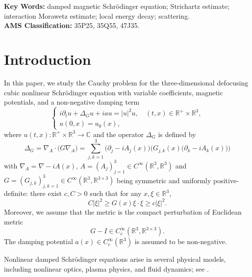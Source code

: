 \documentclass[10pt%
]{amsart}
\numberwithin{equation}{section}
\newcommand{\pa}{\partial}
\newcommand{\R}{\mathbb{R}}
\newcommand{\C}{\mathbb{C}}
\theoremstyle{definition}
\begin{document}
	
	
	\maketitle
	
	\begin{center}
		\begin{minipage}{100mm}
			{ \small {{\bf Key Words:}  damped magnetic  Schr\"odinger equation; Strichartz estimate;  interaction Morawetz estimate; local energy decay; scattering.}
				{}
			}\\
			{ \small {\bf AMS Classification:}
				{35P25,  35Q55, 47J35.}
			}
		\end{minipage}
	\end{center}
	
	
	\section{Introduction}
	
	\noindent
	In this paper, we study the Cauchy problem for the three-dimensional defocusing cubic nonlinear Schr\"odinger equation with variable coefficients, magnetic potentials, and a non-negative damping term
	\begin{equation}\label{equ:DMNLS}
		\begin{cases}
			i\partial_tu+\Delta_{G}u+iau=|u|^{2}u,\quad (t,x)\in\R^+\times\R^3,\\
			u(0,x)=u_0(x),
		\end{cases}
	\end{equation}
	where $u(t,x):\R^+\times\R^3\to\C$ and the operator $\Delta_G$ is defined by
	$$\Delta_G=\nabla_A\cdot\big(G\nabla_A)=\sum_{j,k=1}^3\big(\partial_j-iA_j(x)\big)\big(G_{j,k}(x)\big(\pa_k-iA_k(x)\big)\big)$$
	with $\nabla_A=\nabla-iA(x)$, $A=(A_j)_{j=1}^3\in C^\infty(\R^3,\R^3)$ and $G=(G_{j,k})_{j,k=1}^3\in C^\infty(\R^3,\R^{3\times3})$ being symmetric and uniformly positive-definite: there exist $c,C>0$ such that for any $x,\xi\in \R^3$, 
	\begin{equation}\label{equ:Gpd}
		C|\xi|^2\geq G(x)\xi\cdot\xi\geq c|\xi|^2. 
	\end{equation}
	Moreover, we assume that the metric is the compact perturbation of Euclidean metric 
	$$G-I\in C_c^\infty(\R^3, \R^{3\times3}).$$
	The damping potential $a(x)\in C_c^\infty(\R^3)$ is assumed to be non-negative.
	
	
	Nonlinear damped Schr\"odinger equations arise in several physical models, including nonlinear optics, plasma physics, and fluid dynamics; see \cite{Fib01,GRH80,Tsu84}.
	
\end{document}
